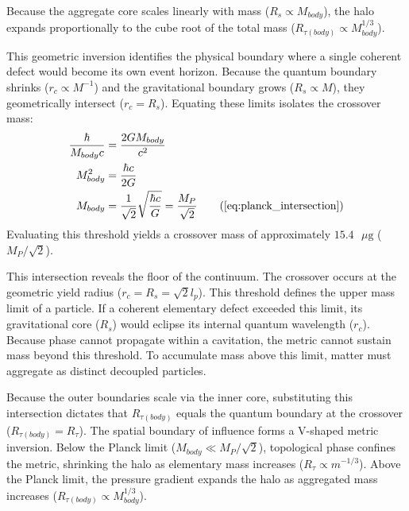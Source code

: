 Because the aggregate core scales linearly with mass ($R_s \propto M_{body}$), the halo expands proportionally to the cube root of the total mass ($R_{\tau(body)} \propto M_{body}^{1/3}$). 

\vspace{0.2 cm}

This geometric inversion identifies the physical boundary where a single coherent defect would become its own event horizon. Because the quantum boundary shrinks ($r_c \propto M^{-1}$) and the gravitational boundary grows ($R_s \propto M$), they geometrically intersect ($r_c = R_s$). Equating these limits isolates the crossover mass: 
\begin{align}
    \frac{\hbar}{M_{body} c} &= \frac{2 G M_{body}}{c^2} \nonumber \\
    M_{body}^2 &= \frac{\hbar c}{2 G} \nonumber \\
    M_{body} &= \frac{1}{\sqrt{2}} \sqrt{\frac{\hbar c}{G}} = \frac{M_P}{\sqrt{2}} \tag{\ref{eq:planck_intersection}}
\end{align}
Evaluating this threshold yields a crossover mass of approximately $15.4 \text{ } \mu\text{g}$ ($M_P/\sqrt{2}$). 

This intersection reveals the floor of the continuum. The crossover occurs at the geometric yield radius ($r_c = R_s = \sqrt{2} l_p$). This threshold defines the upper mass limit of a particle. If a coherent elementary defect exceeded this limit, its gravitational core ($R_s$) would eclipse its internal quantum wavelength ($r_c$). Because phase cannot propagate within a cavitation, the metric cannot sustain mass beyond this threshold. To accumulate mass above this limit, matter must aggregate as distinct decoupled particles. 

Because the outer boundaries scale via the inner core, substituting this intersection dictates that $R_{\tau(body)}$ equals the quantum boundary at the crossover ($R_{\tau(body)} = R_\tau$). The spatial boundary of influence forms a V-shaped metric inversion. Below the Planck limit ($M_{body} \ll M_P/\sqrt{2}$), topological phase confines the metric, shrinking the halo as elementary mass increases ($R_\tau \propto m^{-1/3}$). Above the Planck limit, the pressure gradient expands the halo as aggregated mass increases ($R_{\tau(body)} \propto M_{body}^{1/3}$).


\vspace{0.2 cm}

